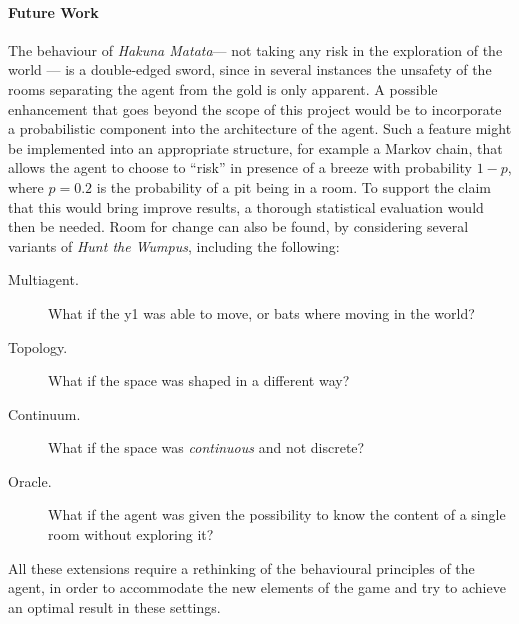 \documentclass{llncs}
\newcommand{\htw}{\emph{Hunt the Wumpus}\xspace}
\newcommand{\hm}{\emph{Hakuna Matata}\xspace}
\begin{document}
\paragraph{Future Work} The behaviour of \hm --- not taking any risk in the exploration of the world --- is a double-edged sword, since in several instances the unsafety of the rooms separating the agent from the gold is only apparent.
A possible enhancement that goes beyond the scope of this project would be to incorporate a probabilistic component into the architecture of the agent.
Such a feature might be implemented into an appropriate structure, for example a Markov chain, that allows the agent to choose to \enquote{risk} in presence of a breeze with probability $1 - p$, where $p = 0.2$ is the probability of a pit being in a room.
To support the claim that this would bring improve results, a thorough statistical evaluation would then be needed.
Room for change can also be found, by considering several variants of \htw, including the following:
\begin{description}
	\item[Multiagent.] What if the y1 was able to move, or bats where moving in the world?
	\item[Topology.] What if the space was shaped in a different way?
	\item[Continuum.] What if the space was \emph{continuous} and not discrete?
	\item[Oracle.] What if the agent was given the possibility to know the content of a single room without exploring it?
\end{description}
All these extensions require a rethinking of the behavioural principles of the agent, in order to accommodate the new elements of the game and try to achieve an optimal result in these settings.



\newpage
{}
\appendix
\footnotesize

\begin{multicols}{2}

\end{multicols}
\end{document}
